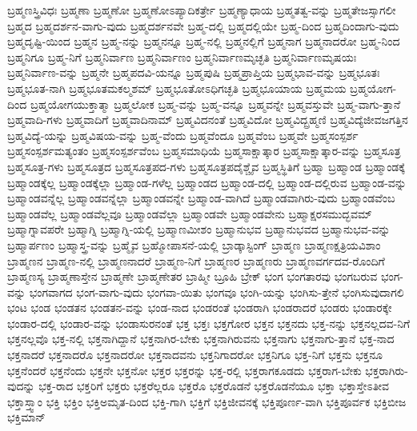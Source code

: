 {ಬ್ರಹ್ಮಣಸ್ತ್ರಿವಿಧಃ
ಬ್ರಹ್ಮಣಾ
ಬ್ರಹ್ಮಣೋ
ಬ್ರಹ್ಮಣೋಽಪ್ಯಾದಿಕರ್ತ್ರೇ
ಬ್ರಹ್ಮಣ್ಯಾಧಾಯ
ಬ್ರಹ್ಮತತ್ವ-ವನ್ನು
ಬ್ರಹ್ಮತೇಜಸ್ಸಾಗಲೀ
ಬ್ರಹ್ಮದ
ಬ್ರಹ್ಮದರ್ಶನ-ವಾಗು-ವುದು
ಬ್ರಹ್ಮದರ್ಶನವೇ
ಬ್ರಹ್ಮ-ದಲ್ಲಿ
ಬ್ರಹ್ಮದಲ್ಲಿಯೇ
ಬ್ರಹ್ಮ-ದಿಂದ
ಬ್ರಹ್ಮದಿಂದಾಗು-ವುದು
ಬ್ರಹ್ಮದೃಷ್ಟಿ-ಯಿಂದ
ಬ್ರಹ್ಮನ
ಬ್ರಹ್ಮ-ನನ್ನು
ಬ್ರಹ್ಮನನ್ನೂ
ಬ್ರಹ್ಮ-ನಲ್ಲಿ
ಬ್ರಹ್ಮನಲ್ಲಿಗೆ
ಬ್ರಹ್ಮನಾಗ
ಬ್ರಹ್ಮನಾದರೋ
ಬ್ರಹ್ಮ-ನಿಂದ
ಬ್ರಹ್ಮನಿಗೂ
ಬ್ರಹ್ಮ-ನಿಗೆ
ಬ್ರಹ್ಮನಿರ್ವಾಣ
ಬ್ರಹ್ಮನಿರ್ವಾಣಂ
ಬ್ರಹ್ಮನಿರ್ವಾಣಮೃಚ್ಛತಿ
ಬ್ರಹ್ಮನಿರ್ವಾಣಮೃಷಯಃ
ಬ್ರಹ್ಮನಿರ್ವಾಣ-ವನ್ನು
ಬ್ರಹ್ಮನೇ
ಬ್ರಹ್ಮಪದವಿ-ಯನ್ನೂ
ಬ್ರಹ್ಮಪುಷಿ
ಬ್ರಹ್ಮಪ್ರಾಪ್ತಿಯ
ಬ್ರಹ್ಮಭಾವ-ವನ್ನು
ಬ್ರಹ್ಮಭೂತಃ
ಬ್ರಹ್ಮಭೂತ-ನಾಗಿ
ಬ್ರಹ್ಮಭೂತಮಕಲ್ಮಶಮ್
ಬ್ರಹ್ಮಭೂತೋಽಧಿಗಚ್ಛತಿ
ಬ್ರಹ್ಮಭೂಯಾಯ
ಬ್ರಹ್ಮಮಯ
ಬ್ರಹ್ಮಯೋಗ-ದಿಂದ
ಬ್ರಹ್ಮಯೋಗಯುಕ್ತಾತ್ಮಾ
ಬ್ರಹ್ಮಲೋಕ
ಬ್ರಹ್ಮ-ವನ್ನು
ಬ್ರಹ್ಮ-ವನ್ನೂ
ಬ್ರಹ್ಮವನ್ನೇ
ಬ್ರಹ್ಮವಸ್ತುವೇ
ಬ್ರಹ್ಮ-ವಾಗು-ತ್ತಾನೆ
ಬ್ರಹ್ಮವಾದಿ-ಗಳು
ಬ್ರಹ್ಮವಾದಿಗೆ
ಬ್ರಹ್ಮವಾದಿನಾಮ್
ಬ್ರಹ್ಮವಿದನಂತೆ
ಬ್ರಹ್ಮವಿದೋ
ಬ್ರಹ್ಮವಿದ್ಬ್ರಹ್ಮಣಿ
ಬ್ರಹ್ಮವಿದ್ಯೆಜೀವಜಗತ್ತಿನ
ಬ್ರಹ್ಮವಿದ್ಯೆ-ಯನ್ನು
ಬ್ರಹ್ಮವಿಷಯ-ವನ್ನು
ಬ್ರಹ್ಮ-ವೆಂದು
ಬ್ರಹ್ಮವೆಂದೂ
ಬ್ರಹ್ಮವೆಂಬ
ಬ್ರಹ್ಮವೇ
ಬ್ರಹ್ಮಸಂಸ್ಪರ್ಶ
ಬ್ರಹ್ಮಸಂಸ್ಪರ್ಶಮತ್ಯಂತಂ
ಬ್ರಹ್ಮಸಂಸ್ಪರ್ಶವೆಂಬ
ಬ್ರಹ್ಮಸಮಾಧಿಯೆ
ಬ್ರಹ್ಮಸಾಕ್ಷಾತ್ಕಾರ
ಬ್ರಹ್ಮಸಾಕ್ಷಾತ್ಕಾರ-ವನ್ನು
ಬ್ರಹ್ಮಸೂತ್ರ
ಬ್ರಹ್ಮಸೂತ್ರ-ಗಳು
ಬ್ರಹ್ಮಸೂತ್ರದ
ಬ್ರಹ್ಮಸೂತ್ರಪದ-ಗಳು
ಬ್ರಹ್ಮಸೂತ್ರಪದೈಶ್ಚೈವ
ಬ್ರಹ್ಮಸ್ಥಿತಿಗೆ
ಬ್ರಹ್ಮಾ
ಬ್ರಹ್ಮಾಂಡ
ಬ್ರಹ್ಮಾಂಡಕ್ಕೆ
ಬ್ರಹ್ಮಾಂಡಕ್ಕೆಲ್ಲ
ಬ್ರಹ್ಮಾಂಡಕ್ಕೆಲ್ಲಾ
ಬ್ರಹ್ಮಾಂಡ-ಗಳೆಲ್ಲ
ಬ್ರಹ್ಮಾಂಡದ
ಬ್ರಹ್ಮಾಂಡ-ದಲ್ಲಿ
ಬ್ರಹ್ಮಾಂಡ-ದಲ್ಲಿರುವ
ಬ್ರಹ್ಮಾಂಡ-ವನ್ನು
ಬ್ರಹ್ಮಾಂಡವನ್ನೆಲ್ಲ
ಬ್ರಹ್ಮಾಂಡವನ್ನೆಲ್ಲಾ
ಬ್ರಹ್ಮಾಂಡವನ್ನೇ
ಬ್ರಹ್ಮಾಂಡ-ವಾಗಿದೆ
ಬ್ರಹ್ಮಾಂಡವಾಗಿರು-ವುದು
ಬ್ರಹ್ಮಾಂಡವೆಂಬ
ಬ್ರಹ್ಮಾಂಡವೆಲ್ಲ
ಬ್ರಹ್ಮಾಂಡವೆಲ್ಲವೂ
ಬ್ರಹ್ಮಾಂಡವೆಲ್ಲಾ
ಬ್ರಹ್ಮಾಂಡವೇ
ಬ್ರಹ್ಮಾಂಡವೇನು
ಬ್ರಹ್ಮಾಕ್ಷರಸಮುದ್ಭವಮ್
ಬ್ರಹ್ಮಾಗ್ನಾವಪರೇ
ಬ್ರಹ್ಮಾಗ್ನಿ
ಬ್ರಹ್ಮಾಗ್ನಿ-ಯಲ್ಲಿ
ಬ್ರಹ್ಮಾಣಮೀಶಂ
ಬ್ರಹ್ಮಾನುಭವ
ಬ್ರಹ್ಮಾನುಭವದ
ಬ್ರಹ್ಮಾನುಭವ-ವನ್ನು
ಬ್ರಹ್ಮಾರ್ಪಣಂ
ಬ್ರಹ್ಮಾಸ್ತ್ರ-ವನ್ನು
ಬ್ರಹ್ಮೈವ
ಬ್ರಹ್ಮೋಪಾಸನೆ-ಯಲ್ಲಿ
ಬ್ರಾಡ್ಕಾಸ್ಟಿಂಗ್
ಬ್ರಾಹ್ಮಣ
ಬ್ರಾಹ್ಮಣಕ್ಷತ್ರಿಯವಿಶಾಂ
ಬ್ರಾಹ್ಮಣನ
ಬ್ರಾಹ್ಮಣ-ನಲ್ಲಿ
ಬ್ರಾಹ್ಮಣನಾದರೆ
ಬ್ರಾಹ್ಮಣ-ನಿಗೆ
ಬ್ರಾಹ್ಮಣರ
ಬ್ರಾಹ್ಮಣರು
ಬ್ರಾಹ್ಮಣವರ್ಗದವ-ರೊಂದಿಗೆ
ಬ್ರಾಹ್ಮಣಸ್ಯ
ಬ್ರಾಹ್ಮಣಾಸ್ತೇನ
ಬ್ರಾಹ್ಮಣೇ
ಬ್ರಾಹ್ಮಣೇತರ
ಬ್ರಾಹ್ಮೀ
ಬ್ರೂಹಿ
ಬ್ರೇಕ್
ಭಂಗ
ಭಂಗತಾರವು
ಭಂಗಬರುವ
ಭಂಗ-ವನ್ನು
ಭಂಗವಾಗದ
ಭಂಗ-ವಾಗು-ವುದು
ಭಂಗವಾ-ಯಿತು
ಭಂಗವೂ
ಭಂಗಿ-ಯನ್ನು
ಭಂಗಿಸು-ತ್ತೇನೆ
ಭಂಗಿಸುವುದಾಗಲಿ
ಭಂಟ
ಭಂಡ
ಭಂಡತನ
ಭಂಡತನ-ವನ್ನು
ಭಂಡ-ನಾದ
ಭಂಡರಂತೆ
ಭಂಡರಾಗಿ
ಭಂಡರಾದರೆ
ಭಂಡರು
ಭಂಡಾರಕ್ಕೇ
ಭಂಡಾರ-ದಲ್ಲಿ
ಭಂಡಾರ-ವನ್ನು
ಭಂಡಾಸುರನಂತೆ
ಭಕ್ತ
ಭಕ್ತಃ
ಭಕ್ತಗೋರ
ಭಕ್ತನ
ಭಕ್ತನದು
ಭಕ್ತ-ನನ್ನು
ಭಕ್ತನಲ್ಲದವ-ನಿಗೆ
ಭಕ್ತನಲ್ಲವೊ
ಭಕ್ತ-ನಲ್ಲಿ
ಭಕ್ತನಾಗಿದ್ದಾನೆ
ಭಕ್ತನಾಗಿರ-ಬೇಕು
ಭಕ್ತನಾಗಿರುವನು
ಭಕ್ತನಾಗು
ಭಕ್ತನಾಗು-ತ್ತಾನೆ
ಭಕ್ತ-ನಾದ
ಭಕ್ತನಾದರೆ
ಭಕ್ತನಾದರೊ
ಭಕ್ತನಾದರೋ
ಭಕ್ತನಾದವನು
ಭಕ್ತನಿಗಾದರೋ
ಭಕ್ತನಿಗೂ
ಭಕ್ತ-ನಿಗೆ
ಭಕ್ತನು
ಭಕ್ತನೂ
ಭಕ್ತನೆಂದರೆ
ಭಕ್ತನೆಂದು
ಭಕ್ತನೇ
ಭಕ್ತನೋ
ಭಕ್ತರ
ಭಕ್ತರನ್ನು
ಭಕ್ತ-ರಲ್ಲಿ
ಭಕ್ತರಾಗಕೂಡದು
ಭಕ್ತರಾಗ-ಬೇಕು
ಭಕ್ತರಾಗಿರು-ವುದನ್ನು
ಭಕ್ತ-ರಾದ
ಭಕ್ತರಿಗೆ
ಭಕ್ತರು
ಭಕ್ತರೆಲ್ಲರೂ
ಭಕ್ತರೊ
ಭಕ್ತರೊಡನೆ
ಭಕ್ತರೊಡನೆಯೂ
ಭಕ್ತಾ
ಭಕ್ತಾಸ್ತೇಽತೀವ
ಭಕ್ತಾಸ್ತ್ವಾಂ
ಭಕ್ತಿ
ಭಕ್ತಿಂ
ಭಕ್ತಿಅಮೃತ-ದಿಂದ
ಭಕ್ತಿ-ಗಾಗಿ
ಭಕ್ತಿಗೆ
ಭಕ್ತಿಜೀವನಕ್ಕೆ
ಭಕ್ತಿಪೂರ್ಣ-ವಾಗಿ
ಭಕ್ತಿಪೂರ್ವಕ
ಭಕ್ತಿಬೀಜ
ಭಕ್ತಿಮಾನ್
}
